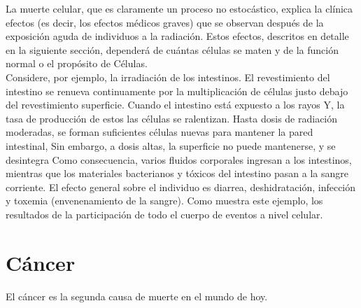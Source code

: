 \documentclass[]{article}
\begin{document}
La muerte celular, que es claramente un proceso no estocástico, explica la clínica efectos (es decir, los efectos médicos graves) que se observan después de la exposición aguda de individuos a la radiación. Estos efectos, descritos en detalle en la siguiente sección, dependerá de cuántas células se maten y de la función normal o el propósito de Células.\\

Considere, por ejemplo, la irradiación de los intestinos. El revestimiento del intestino se renueva continuamente por la multiplicación de células justo debajo del revestimiento superficie. Cuando el intestino está expuesto a los rayos Y, la tasa de producción de estos las células se ralentizan. Hasta dosis de radiación moderadas, se forman suficientes células nuevas para mantener la pared intestinal, Sin embargo, a dosis altas, la superficie no puede mantenerse, y se desintegra Como consecuencia, varios fluidos corporales ingresan a los intestinos, mientras que los materiales bacterianos y tóxicos del intestino pasan a la sangre corriente. El efecto general sobre el individuo es diarrea, deshidratación, infección y toxemia (envenenamiento de la sangre). Como muestra este ejemplo, los resultados de la participación de todo el cuerpo de eventos a nivel celular.\\

\section{Cáncer}

El cáncer es la segunda causa de muerte en el mundo de hoy.


\end{document}
